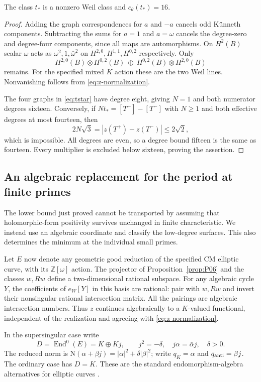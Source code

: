 \begin{theorem}
\label{thm:P09}
The class $t_*$ is a nonzero Weil class and $c_\theta(t_*)=16$.
\end{theorem}
\begin{proof}
Adding the graph correspondences for $a$ and $-a$ cancels odd K\"unneth components.  Subtracting the sums for $a=1$ and $a=\omega$ cancels the degree-zero and degree-four components, since all maps are automorphisms.  On $H^2(B)$ scalar $\omega$ acts as $\omega^2,1,\bar\omega^2$ on $H^{2,0},H^{1,1},H^{0,2}$ respectively.  Only
\[
 H^{2,0}(B)\otimes H^{0,2}(B)
 \ \oplus\ H^{0,2}(B)\otimes H^{2,0}(B)
\]
remains.  For the specified mixed $K$ action these are the two Weil lines.  Nonvanishing follows from \eqref{eq:z-normalization}.

The four graphs in \eqref{eq:tstar} have degree eight, giving $N=1$ and both numerator degrees sixteen.  Conversely, if $Nt_*=[T^+]-[T^-]$ with $N\geq1$ and both effective degrees at most fourteen, then
\[
 2N\sqrt3=|z(T^+)-z(T^-)|\leq2\sqrt2,
\]
which is impossible.  All degrees are even, so a degree bound fifteen is the same as fourteen.  Every multiplier is excluded below sixteen, proving the assertion.
\end{proof}

\subsection{An algebraic replacement for the period at finite primes}

The lower bound just proved cannot be transported by assuming that holomorphic-form positivity survives unchanged in finite characteristic.  We instead use an algebraic coordinate and classify the low-degree surfaces.  This also determines the minimum at the individual small primes.

Let $E$ now denote any geometric good reduction of the specified CM elliptic curve, with its $\mathbb Z[\omega]$ action.  The projector of Proposition~\ref{prop:P06} and the classes $w,Rw$ define a two-dimensional rational subspace.  For any algebraic cycle $Y$, the coefficients of $e_W[Y]$ in this basis are rational: pair with $w,Rw$ and invert their nonsingular rational intersection matrix.  All the pairings are algebraic intersection numbers.  Thus $z$ continues algebraically to a $K$-valued functional, independent of the realization and agreeing with \eqref{eq:z-normalization}.

In the supersingular case write
\[
 D=\operatorname{End}^0(E)=K\oplus Kj,\qquad
 j^2=-\delta,\quad j\alpha=\bar\alpha j,\quad \delta>0.
\]
The reduced norm is $\mathrm N(\alpha+\beta j)=|\alpha|^2+\delta|\beta|^2$; write $q_K=\alpha$ and $q_{\rm anti}=\beta j$.  The ordinary case has $D=K$.  These are the standard endomorphism-algebra alternatives for elliptic curves \cite[Theorem II.6.9]{MilneEC}.

